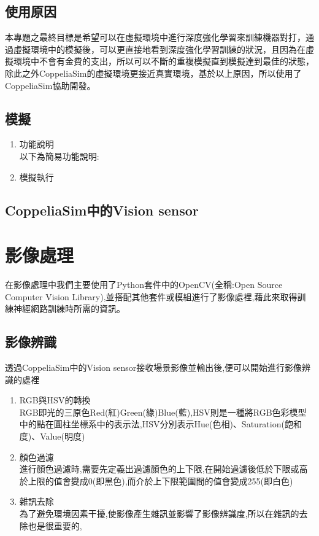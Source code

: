 \documentclass[14pt,a4paper]{report}  %
\begin{document}
\subsection{使用原因}
 本專題之最終目標是希望可以在虛擬環境中進行深度強化學習來訓練機器對打，通過虛擬環境中的模擬後，可以更直接地看到深度強化學習訓練的狀況，且因為在虛擬環境中不會有金費的支出，所以可以不斷的重複模擬直到模擬達到最佳的狀態，除此之外CoppeliaSim的虛擬環境更接近真實環境，基於以上原因，所以使用了CoppeliaSim協助開發。\\
\subsection{模擬}
\begin{enumerate}

\item 功能說明\\
以下為簡易功能說明:
\item 模擬執行\\

\end{enumerate}
\subsection{CoppeliaSim中的Vision sensor}

\section{影像處理}
\qquad 在影像處理中我們主要使用了Python套件中的OpenCV(全稱:Open Source Computer Vision Library),並搭配其他套件或模組進行了影像處裡,藉此來取得訓練神經網路訓練時所需的資訊。\\
\subsection{影像辨識}
\qquad 透過CoppeliaSim中的Vision sensor接收場景影像並輸出後,便可以開始進行影像辨識的處裡\\
\begin{enumerate}
\item RGB與HSV的轉換\\
RGB即光的三原色Red(紅)Green(綠)Blue(藍),HSV則是一種將RGB色彩模型中的點在圓柱坐標系中的表示法,HSV分別表示Hue(色相)、Saturation(飽和度)、Value(明度)\\
\item 顏色過濾\\
進行顏色過濾時,需要先定義出過濾顏色的上下限,在開始過濾後低於下限或高於上限的值會變成0(即黑色),而介於上下限範圍間的值會變成255(即白色)\\
\item 雜訊去除\\
為了避免環境因素干擾,使影像產生雜訊並影響了影像辨識度,所以在雜訊的去除也是很重要的,
\end{enumerate}
\newpage
\end{document}
